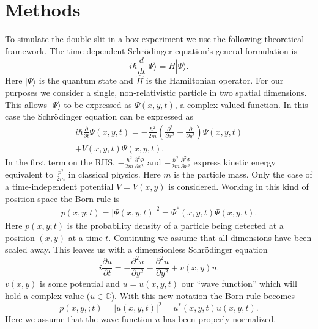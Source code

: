 \documentclass[english,notitlepage,reprint,nofootinbib]{revtex4-1}  %
\begin{document}
\section{Methods}\label{sec:methods}
%
To simulate the double-slit-in-a-box experiment we use the following theoretical framework. The time-dependent Schrödinger equation's general formulation is
\begin{equation}
    i \hbar \frac{d}{dt} | \Psi \rangle = \hat{H} | \Psi \rangle.
\end{equation}
Here $| \Psi \rangle$ is the quantum state and $\hat{H}$ is the Hamiltonian operator. For our purposes we consider a single, non-relativistic particle in two spatial dimensions. This allows $| \Psi \rangle$ to be expressed as $ \Psi (x,y,t)$, a complex-valued function. In this case the Schrödinger equation can be expressed as
\begin{align}
    i \hbar \frac{\partial}{\partial t} \Psi(x,y,t) = - \frac{\hbar^2}{2m} \left( \frac{\partial^2}{\partial x^2} + \frac{\partial}{\partial y^2}\right) \Psi(x,y,t) \\
    + V(x,y,t) \Psi (x,y,t).
\end{align}
In the first term on the RHS, $- \frac{\hbar^2}{2m} \frac{\partial^2 \Psi}{\partial x^2}$ and $- \frac{\hbar^2}{2m} \frac{\partial^2 \Psi}{\partial x^2}$ express kinetic energy equivalent to $\frac{p^2}{2m}$ in classical physics. Here $m$ is the particle mass. Only the case of a time-independent potential $V = V(x,y)$ is considered. Working in this kind of position space the Born rule is
\begin{align}
    p(x,y;t) = |\Psi(x,y,t)|^2 = \Psi^{\ast} (x,y,t) \Psi(x,y,t).
\end{align}
Here $p(x,y;t)$ is the probability density of a particle being detected at a position $(x,y)$ at a time $t$. Continuing we assume that all dimensions have been scaled away. This leaves us with a dimensionless Schrödinger equation
\begin{equation}
    i \frac{\partial u}{\partial t} = - \frac{\partial^2 u}{\partial y^2} - \frac{\partial^2 u}{\partial y^2} + v(x,y)u. \label{eq:wave_eq}
\end{equation}
$v(x,y)$ is some potential and $u = u(x,y,t)$ our ``wave function'' which will hold a complex value ($u \in \mathbb{C}$). With this new notation the Born rule becomes
\begin{equation}
    p(x,y,;t) = |u(x,y,t)|^2 = u^{\ast} (x,y,t) u(x,y,t).
\end{equation}
Here we assume that the wave function $u$ has been properly normalized.
\end{document}
